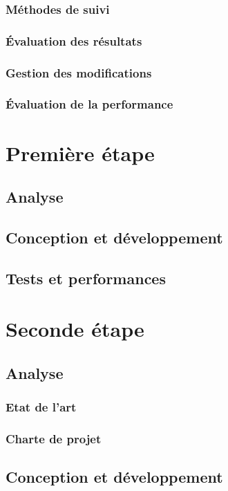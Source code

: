 \documentclass[a4paper, 12pt]{report}
\begin{document}
        \subsection{Méthodes de suivi}
        \subsection{Évaluation des résultats}
        \subsection{Gestion des modifications}
        \subsection{Évaluation de la performance}
    

\chapter{Première étape}
\minitoc
{}
\clearpage
    \section{Analyse}
    \section{Conception et développement}
    \section{Tests et performances}


\chapter{Seconde étape}
\minitoc
{}
\clearpage
    \section{Analyse}
        \subsection{Etat de l'art}
        \subsection{Charte de projet}
    \section{Conception et développement}
\end{document}
